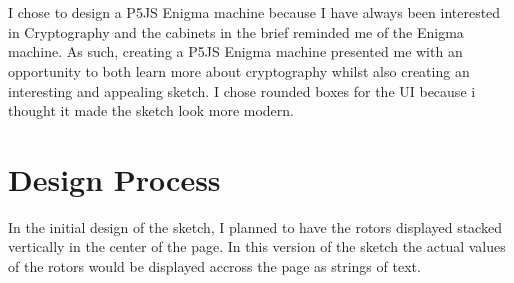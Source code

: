 \documentclass[12pt,a4paper]{article}
\begin{document}
		\begin{center}
			\\
			\vspace{0.5cm}
			\\
		\end{center}

		I chose to design a P5JS Enigma machine because I have always been interested 
		in Cryptography and the cabinets in the brief reminded me of the Enigma machine. 
		As such, creating a P5JS Enigma machine presented me with an opportunity to 
		both learn more about cryptography whilst also creating an interesting and appealing 
		sketch. I chose rounded boxes for the UI because i thought it made the sketch look 
		more modern. \\

	\newpage

	\section{Design Process}
		In the initial design of the sketch, I planned to have the rotors displayed stacked 
		vertically in the center of the page. In this version of the sketch the actual values 
		of the rotors would be displayed accross the page as strings of text.\\
		
\end{document}
